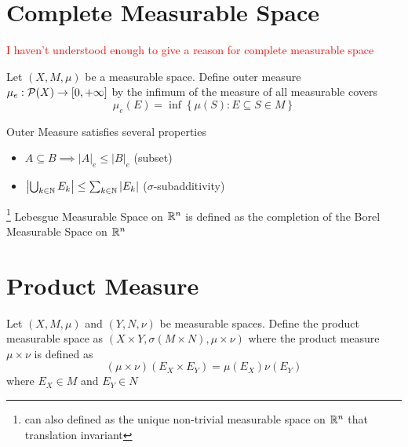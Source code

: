 \documentclass{report}
\begin{document}
\section{Complete Measurable Space}
\textcolor{red}{I haven't understood enough to give a reason for complete measurable space}

\begin{definition}
    Let $(X, M, \mu)$ be a measurable space. Define outer measure $\mu_e: \mathcal{P}(X) \to [0, +\infty]$ by the infimum of the measure of all measurable covers
    \[
        \mu_e(E) = \inf \left\{ \mu(S): E \subseteq S \in M \right\}
    \]
\end{definition}

Outer Measure satisfies several properties

\begin{itemize}
    \item $A \subseteq B \implies |A|_e \leq |B|_e$ (subset)
    \item $\left| \bigcup_{k \in \mathbb{N}} E_k \right| \leq \sum_{k \in \mathbb{N}} |E_k|$ ($\sigma$-subadditivity)
\end{itemize}

\begin{definition}
    
\end{definition}

\begin{definition}
    
\end{definition}

\begin{definition} \footnote{can also defined as the unique non-trivial measurable space on $\mathbb{R}^n$ that translation invariant}
    Lebesgue Measurable Space on $\mathbb{R}^n$ is defined as the completion of the Borel Measurable Space on $\mathbb{R}^n$
\end{definition}

\section{Product Measure}

\begin{definition}
    Let $(X, M, \mu)$ and $(Y, N, \nu)$ be measurable spaces. Define the product measurable space as $(X \times Y, \sigma(M \times N), \mu \times \nu)$ where the product measure $\mu \times \nu$ is defined as
    \[
        (\mu \times \nu)(E_X \times E_Y) = \mu(E_X) \nu(E_Y)
    \]
    where $E_X \in M$ and $E_Y \in N$
\end{definition}
\end{document}

